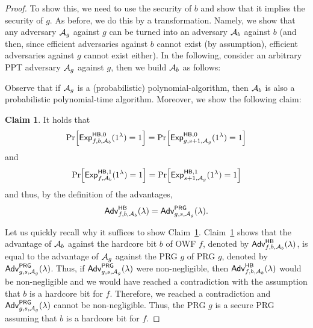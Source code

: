 \documentclass[a4paper,table,dvipsnames]{article}
\theoremstyle{definition}
\newtheorem{claim}{Claim}
\begin{document}
\begin{proof}
To show this, we need to use the security of $b$ and show that it implies the security of $g$.
As before, we do this by a transformation. Namely, we show that any adversary $\mathcal{A}_g$ against $g$ can
be turned into an adversary $\mathcal{A}_b$ against $b$ (and then, since efficient adversaries against $b$ cannot
 exist (by assumption), efficient adversaries against $g$ cannot exist either). In the following, consider
an arbitrary PPT adversary $\mathcal{A}_g$ against $g$, then we build $\mathcal{A}_b$ as follows:
\begin{center}
				\begin{pchstack}
				\end{pchstack}
			\end{center}
Observe that if $\mathcal{A}_g$ is a (probabilistic) polynomial-algorithm, then $\mathcal{A}_b$ is also a probabilistic
polynomial-time algorithm. Moreover, we show the following claim:
\begin{claim}\label{claim:hbprg}
It holds that
\begin{equation}\label{eqn:lalaland}
\prob{{\mathsf{Exp}}_{f,b,\adv_b}^{\mathsf{HB},0}(1^\lambda) = 1} = \prob{{\mathsf{Exp}}_{g,s+1,\adv_g}^{\mathsf{HB},0}(1^\lambda) = 1}
\end{equation}
and
\begin{equation}\label{eqn:lalaland1}
\prob{{\mathsf{Exp}}_{f,\adv_b}^{\mathsf{HB},1}(1^\lambda) = 1} = \prob{{\mathsf{Exp}}_{s+1,\adv_g}^{\mathsf{HB},1}(1^\lambda) = 1}
\end{equation}
and thus, by the definition of the advantages,
\[\mathsf{Adv}^{\mathsf{HB}}_{f,b,\mathcal{A}_b}(\lambda)=
\mathsf{Adv}^{\mathsf{PRG}}_{g,s,\mathcal{A}_g}(\lambda).\]
\end{claim}
Let us quickly recall why it suffices to show Claim~\ref{claim:hbprg}. Claim~\ref{claim:hbprg} shows that
the advantage of $\mathcal{A}_b$ against the hardcore bit $b$ of OWF $f$, denoted by $\mathsf{Adv}^{\mathsf{HB}}_{f,b,\mathcal{A}_b}(\lambda)$,
is equal to the advantage of $\mathcal{A}_g$ against the PRG $g$ of PRG $g$, denoted by $\mathsf{Adv}^{\mathsf{PRG}}_{g,s,\mathcal{A}_g}(\lambda)$.
Thus, if $\mathsf{Adv}^{\mathsf{PRG}}_{g,s,\mathcal{A}_g}(\lambda)$ were non-negligible, then $\mathsf{Adv}^{\mathsf{HB}}_{f,b,\mathcal{A}_b}(\lambda)$ would be non-negligible and we would have reached a contradiction with the assumption that $b$ is a hardcore bit for $f$. Therefore,
we reached a contradiction and $\mathsf{Adv}^{\mathsf{PRG}}_{g,s,\mathcal{A}_g}(\lambda)$ cannot be non-negligible. Thus, the PRG $g$ is a secure PRG assuming that $b$ is a hardcore bit for $f$.


\end{proof}
\end{document}
